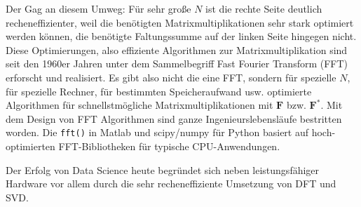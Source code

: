 Der Gag an diesem Umweg:
Für sehr große $N$ ist die rechte Seite deutlich recheneffizienter, weil
die benötigten Matrixmultiplikationen sehr stark optimiert werden können, die benötigte
Faltungssumme auf der linken Seite hingegen nicht.
%
Diese Optimierungen, also effiziente Algorithmen zur Matrixmultiplikation
sind seit den 1960er Jahren unter dem Sammelbegriff Fast Fourier Transform
(FFT) erforscht und realisiert.
Es gibt also nicht die eine FFT, sondern für spezielle $N$, für
spezielle Rechner, für bestimmten Speicheraufwand usw.
optimierte Algorithmen für schnellstmögliche Matrixmultiplikationen mit
$\bm{F}$ bzw. $\bm{F}^\mathrm{*}$. Mit dem Design von FFT Algorithmen sind ganze
Ingenieurslebensläufe bestritten worden. Die \texttt{fft()} in Matlab und
scipy/numpy für Python basiert auf hoch-optimierten FFT-Bibliotheken für
typische CPU-Anwendungen.

Der Erfolg von Data Science heute begründet sich neben leistungsfähiger Hardware
vor allem durch die sehr recheneffiziente Umsetzung von DFT und SVD.

